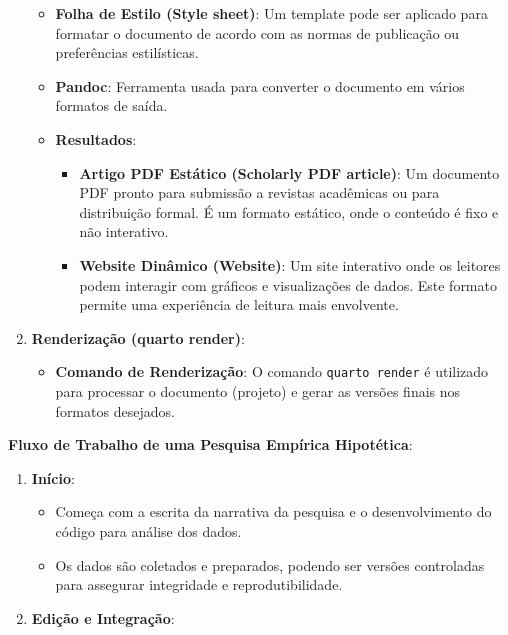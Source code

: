 \documentclass[
  a4paper,
]{book}
\providecommand{\tightlist}{%
  \setlength{\itemsep}{0pt}\setlength{\parskip}{0pt}}\usepackage{longtable,booktabs,array}
\begin{document}
\begin{tcolorbox}
\begin{enumerate}
  \begin{itemize}
  \tightlist
  \item
    \textbf{Folha de Estilo (Style sheet)}: Um template pode ser
    aplicado para formatar o documento de acordo com as normas de
    publicação ou preferências estilísticas.
  \item
    \textbf{Pandoc}: Ferramenta usada para converter o documento em
    vários formatos de saída.
  \item
    \textbf{Resultados}:

    \begin{itemize}
    \tightlist
    \item
      \textbf{Artigo PDF Estático (Scholarly PDF article)}: Um documento
      PDF pronto para submissão a revistas acadêmicas ou para
      distribuição formal. É um formato estático, onde o conteúdo é fixo
      e não interativo.
    \item
      \textbf{Website Dinâmico (Website)}: Um site interativo onde os
      leitores podem interagir com gráficos e visualizações de dados.
      Este formato permite uma experiência de leitura mais envolvente.
    \end{itemize}
  \end{itemize}
\item
  \textbf{Renderização (quarto render)}:

  \begin{itemize}
  \tightlist
  \item
    \textbf{Comando de Renderização}: O comando \texttt{quarto\ render}
    é utilizado para processar o documento (projeto) e gerar as versões
    finais nos formatos desejados.\vspace{0.5em}
  \end{itemize}
\end{enumerate}

\textbf{Fluxo de Trabalho de uma Pesquisa Empírica
Hipotética}:\vspace{0.5em}

\begin{enumerate}
\def\labelenumi{\arabic{enumi}.}
\tightlist
\item
  \textbf{Início}:

  \begin{itemize}
  \tightlist
  \item
    Começa com a escrita da narrativa da pesquisa e o desenvolvimento do
    código para análise dos dados.
  \item
    Os dados são coletados e preparados, podendo ser versões controladas
    para assegurar integridade e reprodutibilidade.
  \end{itemize}
\item
  \textbf{Edição e Integração}:


\end{enumerate}
\end{tcolorbox}
\end{document}
